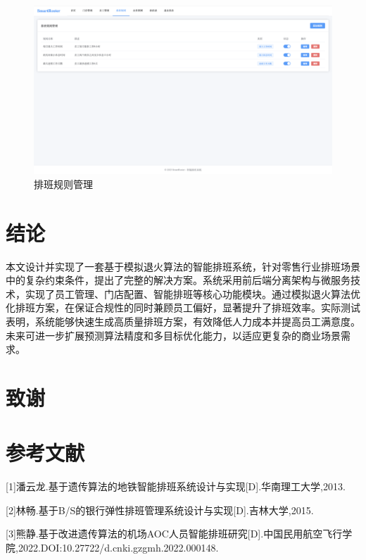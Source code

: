 \documentclass{ctexart}
\begin{document}
\begin{figure}[H]
    \centering
    \includegraphics[width=0.8\linewidth]{./source/排班规则管理.png}
    \caption{排班规则管理}
    \label{fig:microservice-arch}
\end{figure}




\section{结论}
本文设计并实现了一套基于模拟退火算法的智能排班系统，针对零售行业排班场景中的复杂约束条件，提出了完整的解决方案。系统采用前后端分离架构与微服务技术，实现了员工管理、门店配置、智能排班等核心功能模块。通过模拟退火算法优化排班方案，在保证合规性的同时兼顾员工偏好，显著提升了排班效率。实际测试表明，系统能够快速生成高质量排班方案，有效降低人力成本并提高员工满意度。未来可进一步扩展预测算法精度和多目标优化能力，以适应更复杂的商业场景需求。

\section*{致谢}

\section*{参考文献}
[1]潘云龙.基于遗传算法的地铁智能排班系统设计与实现[D].华南理工大学,2013.

[2]林畅.基于B/S的银行弹性排班管理系统设计与实现[D].吉林大学,2015.

[3]熊静.基于改进遗传算法的机场AOC人员智能排班研究[D].中国民用航空飞行学院,2022.DOI:10.27722/d.cnki.gzgmh.2022.000148.

\appendix
{}

\end{document}
